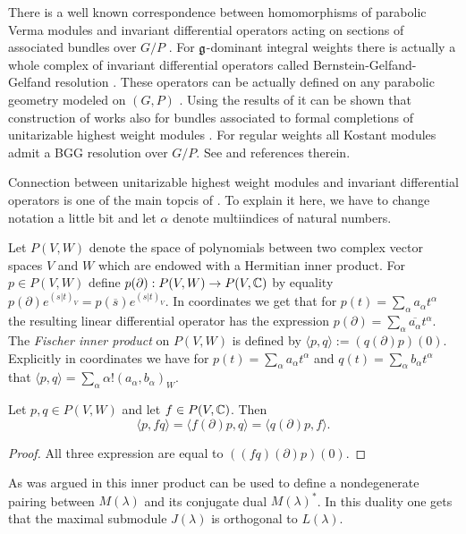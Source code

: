 There is a well known correspondence between homomorphisms of parabolic Verma modules and invariant differential operators acting on sections of associated bundles over $G/P$ \cite{cap_bernstein-gelfand-gelfand_2001}. For $\mathfrak{g}$-dominant integral weights there is actually a whole complex of invariant differential operators called Bernstein-Gelfand-Gelfand resolution \cite{bernstein_differential_1975}.  These operators can be actually defined on any parabolic geometry modeled on $(G, P)$ \cite{cap_bernstein-gelfand-gelfand_2001, calderbank_differential_2001}. Using the results of \cite{huang_dirac_2006} it can be shown that construction of \cite{calderbank_differential_2001} works also for bundles associated to formal completions of unitarizable highest weight modules \cite{tucek_yamabe_2012}. For regular weights all Kostant modules admit a BGG resolution over $G/P$. See \cite{enright_diagrams_2014} and references therein. 

Connection between unitarizable highest weight modules and invariant differential operators is one of the main topcis of \cite{davidson_differential_1991}. To explain it here, we have to change notation a little bit and let $\alpha$ denote multiindices of natural numbers.

Let $P(V,W)$ denote the space of polynomials between two complex vector spaces $V$ and $W$ which are endowed with a Hermitian inner product. For $p\in P(V,W)$ define $p(\partial):P(V,W)\to P(V,\mathbb{C})$ by equality $p(\partial) e^{(s|t)_V} = p(\overline{s})e^{(s|t)_V}$. In coordinates we get that for $p(t) = \sum_{\alpha} a_{\alpha} t^{\alpha}$ the resulting linear differential operator has the expression $p(\partial)= \sum_{\alpha} \overline{a_{\alpha}} t^{\alpha}$. The \emph{Fischer inner product} on $P(V,W)$ is defined by $\langle p,q\rangle := (q(\partial)p)(0)$. Explicitly in coordinates we have for  $p(t) = \sum_{\alpha} a_{\alpha} t^{\alpha}$ and  $q(t) = \sum_{\alpha} b_{\alpha} t^{\alpha}$ that $\langle p,q\rangle = \sum_{\alpha} \alpha! (a_{\alpha},b_{\alpha})_W$.

\begin{lemma}
 Let $p,q\in P(V,W)$ and let $f\in P(V,\mathbb{C})$. Then
 \[
  \langle p,fq\rangle = \langle f(\partial)p, q \rangle = \langle q(\partial)p,f \rangle.
 \]
\end{lemma}
\begin{proof}
 All three expression are equal to $((fq)(\partial)p)(0)$.
\end{proof}

As was argued in \cite{davidson_differential_1991} this inner product can be used to define a nondegenerate pairing between $M(\lambda)$ and its conjugate dual $M(\lambda)^*$. In this duality one gets that the maximal submodule $J(\lambda)$ is orthogonal to $L(\lambda)$.

